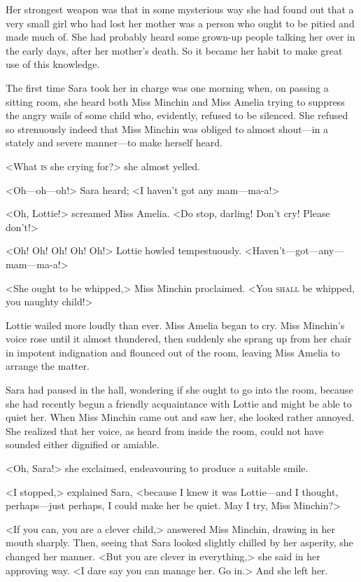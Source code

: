 Her strongest weapon was that in some mysterious way she had found out that a very small girl who had lost her mother was a person who ought to be pitied and made much of. She had probably heard some grown-up people talking her over in the early days, after her mother's death. So it became her habit to make great use of this knowledge.

The first time Sara took her in charge was one morning when, on passing a sitting room, she heard both Miss Minchin and Miss Amelia trying to suppress the angry wails of some child who, evidently, refused to be silenced. She refused so strenuously indeed that Miss Minchin was obliged to almost shout—in a stately and severe manner—to make herself heard.

<What \textsc{is} she crying for?> she almost yelled.

<Oh—oh—oh!> Sara heard; <I haven't got any mam—ma-a!>

<Oh, Lottie!> screamed Miss Amelia. <Do stop, darling! Don't cry! Please don't!>

<Oh! Oh! Oh! Oh! Oh!> Lottie howled tempestuously. <Haven't—got—any—mam—ma-a!>

<She ought to be whipped,> Miss Minchin proclaimed. <You \textsc{shall} be whipped, you naughty child!>

Lottie wailed more loudly than ever. Miss Amelia began to cry. Miss Minchin's voice rose until it almost thundered, then suddenly she sprang up from her chair in impotent indignation and flounced out of the room, leaving Miss Amelia to arrange the matter.

Sara had paused in the hall, wondering if she ought to go into the room, because she had recently begun a friendly acquaintance with Lottie and might be able to quiet her. When Miss Minchin came out and saw her, she looked rather annoyed. She realized that her voice, as heard from inside the room, could not have sounded either dignified or amiable.

<Oh, Sara!> she exclaimed, endeavouring to produce a suitable smile.

<I stopped,> explained Sara, <because I knew it was Lottie—and I thought, perhaps—just perhaps, I could make her be quiet. May I try, Miss Minchin?>

<If you can, you are a clever child,> answered Miss Minchin, drawing in her mouth sharply. Then, seeing that Sara looked slightly chilled by her asperity, she changed her manner. <But you are clever in everything,> she said in her approving way. <I dare say you can manage her. Go in.> And she left her.

